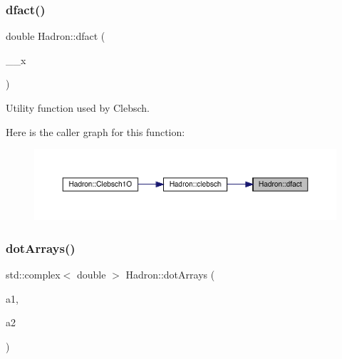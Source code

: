 \subsubsection{\texorpdfstring{dfact()}{dfact()}}
{\footnotesize\ttfamily double Hadron\+::dfact (\begin{DoxyParamCaption}\item[{double}]{\+\_\+\+\_\+x }\end{DoxyParamCaption})\hspace{0.3cm}{\ttfamily [inline]}}



Utility function used by Clebsch. 

Here is the caller graph for this function\+:
\nopagebreak
\begin{figure}[H]
\begin{center}
\leavevmode
\includegraphics[width=350pt]{d1/daf/namespaceHadron_a5851b4dcb78567e53c44241a6db6c87e_icgraph}
\end{center}
\end{figure}
\mbox{\label{namespaceHadron_aad081d14cd95160e164751fe86cff3af}} 
\subsubsection{\texorpdfstring{dotArrays()}{dotArrays()}}
{\footnotesize\ttfamily std\+::complex$<$ double $>$ Hadron\+::dot\+Arrays (\begin{DoxyParamCaption}\item[{const \mbox{\hyperlink{classADAT_1_1Array1dO}{A\+D\+A\+T\+::\+Array1dO}}$<$ \mbox{\hyperlink{namespaceHadron_abaab2f90393b8dd8d93060e6ce6568e7}{cdouble}} $>$ \&}]{a1,  }\item[{const \mbox{\hyperlink{classADAT_1_1Array1dO}{A\+D\+A\+T\+::\+Array1dO}}$<$ \mbox{\hyperlink{namespaceHadron_abaab2f90393b8dd8d93060e6ce6568e7}{cdouble}} $>$ \&}]{a2 }\end{DoxyParamCaption})}

